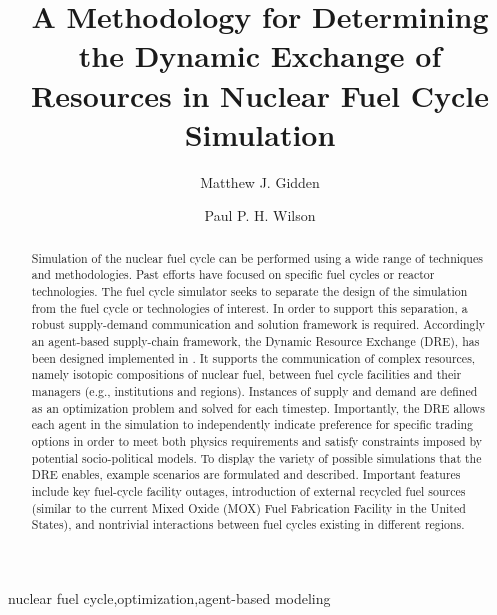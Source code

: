 

\begin{frontmatter}

\title{A Methodology for Determining the Dynamic Exchange of Resources in
  Nuclear Fuel Cycle Simulation}

\author[iiasa,uw]{Matthew J. Gidden}
\author[uw]{Paul P. H. Wilson}
\address[iiasa]{International Institute for Applied Systems Analysis,
  Schlossplatz 1, A-2361 Laxenburg, Austria}
\address[uw]{University of Wisconsin - Madison, Department of Nuclear
  Engineering and Engineering Physics, Madison, WI 53706}

\begin{abstract}
Simulation of the nuclear fuel cycle can be performed using a wide range of
techniques and methodologies. Past efforts have focused on specific fuel cycles
or reactor technologies. The \Cyclus fuel cycle simulator seeks to separate the
design of the simulation from the fuel cycle or technologies of interest. In
order to support this separation, a robust supply-demand communication and
solution framework is required. Accordingly an agent-based supply-chain
framework, the Dynamic Resource Exchange (DRE), has been designed implemented in
\Cyclus. It supports the communication of complex resources, namely isotopic
compositions of nuclear fuel, between fuel cycle facilities and their managers
(e.g., institutions and regions). Instances of supply and demand are defined as
an optimization problem and solved for each timestep. Importantly, the DRE
allows each agent in the simulation to independently indicate preference for
specific trading options in order to meet both physics requirements and satisfy
constraints imposed by potential socio-political models.  To display the variety
of possible simulations that the DRE enables, example scenarios are formulated
and described. Important features include key fuel-cycle facility outages,
introduction of external recycled fuel sources (similar to the current Mixed
Oxide (MOX) Fuel Fabrication Facility in the United States), and nontrivial
interactions between fuel cycles existing in different regions.
\end{abstract}

\begin{keyword}
nuclear fuel cycle\sep  optimization\sep agent-based modeling
\end{keyword}

\end{frontmatter}

\linenumbers
